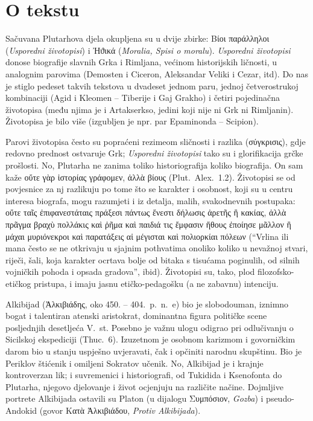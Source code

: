 


\section*{O tekstu}

Sačuvana Plutarhova djela okupljena su u dvije zbirke: \textgreek[variant=ancient]{Βίοι παράλληλοι} (\textit{Usporedni životopisi}) i \textgreek[variant=ancient]{Ἠϑικά} (\textit{Moralia, Spisi o moralu}). \textit{Usporedni životopisi} donose biografije slavnih Grka i Rimljana, većinom historijskih ličnosti, u analognim parovima (Demosten i Ciceron, Aleksandar Veliki i Cezar, itd). Do nas je stiglo pedeset takvih tekstova u dvadeset jednom paru, jednoj četverostrukoj kombinaciji (Agid i Kleomen – Tiberije i Gaj Grakho) i četiri pojedinačna životopisa (među njima je i Artakserkso, jedini koji nije ni Grk ni Rimljanin). Životopisa je bilo više (izgubljen je npr. par Epaminonda – Scipion).

Parovi životopisa često su popraćeni rezimeom sličnosti i razlika \textgreek[variant=ancient]{(σύγκρισις),} gdje redovno prednost ostvaruje Grk; \textit{Usporedni životopisi} tako su i glorifikacija grčke prošlosti. No, Plutarha ne zanima toliko historiografija koliko biografija. On sam kaže \textgreek[variant=ancient]{οὔτε γὰρ ἱστορίας γράφομεν, ἀλλὰ βίους} (Plut.\ Alex.~1.2). Životopisi se od povjesnice za nj razlikuju po tome što se karakter i osobnost, koji su u centru interesa biografa, mogu razumjeti i iz detalja, malih, svakodnevnih postupaka: \textgreek[variant=ancient]{οὔτε ταῖς ἐπιφανεστάταις πράξεσι πάντως ἔνεστι δήλωσις ἀρετῆς ἢ κακίας, ἀλλὰ πρᾶγμα βραχὺ πολλάκις καὶ ῥῆμα καὶ παιδιά τις ἔμφασιν ἤθους ἐποίησε μᾶλλον ἢ μάχαι μυριόνεκροι καὶ παρατάξεις αἱ μέγισται καὶ πολιορκίαι πόλεων} (``Vrlina ili mana često se ne otkrivaju u sjajnim pothvatima onoliko koliko u nevažnoj stvari, riječi, šali, koja karakter ocrtava bolje od bitaka s tisućama poginulih, od silnih vojničkih pohoda i opsada gradova'', ibid). Životopisi su, tako, plod filozofsko-etičkog pristupa, i imaju jasnu etičko-pedagošku (a ne zabavnu) intenciju. 

Alkibijad \textgreek[variant=ancient]{(Ἀλκιβιάδης,} oko 450. – 404.\ p.~n.~e) bio je slobodouman, iznimno bogat i talentiran atenski aristokrat, dominantna figura političke scene posljednjih desetljeća V.\ st. Posebno je važnu ulogu odigrao pri odlučivanju o Sicilskoj ekspediciji (Thuc.~6). Izuzetnom je osobnom karizmom i govorničkim darom bio u stanju uspješno uvjeravati, čak i opčiniti narodnu skupštinu. Bio je Periklov štićenik i omiljeni Sokratov učenik. No, Alkibijad je i krajnje kontroverzan lik; i suvremenici i historiografi, od Tukidida i Ksenofonta do Plutarha, njegovo djelovanje i život ocjenjuju na različite načine. Dojmljive portrete Alkibijada ostavili su Platon (u dijalogu \textgreek[variant=ancient]{Συμπόσιον,} \textit{Gozba}) i pseudo-Andokid (govor \textgreek[variant=ancient]{Κατὰ Ἀλκιβιάδου,} \textit{Protiv Alkibijada}).

